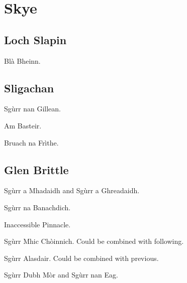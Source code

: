 
\section{Skye}

\subsection{Loch Slapin}

\begin{munros}
\item
Blà Bheinn.
\end{munros}


\subsection{Sligachan}

\begin{munros}
\item
Sgùrr nan Gillean.

\item
Am Basteir.

\item
Bruach na Frìthe.
\end{munros}


\subsection{Glen Brittle}

\begin{munros}
\item
Sgùrr a Mhadaidh and Sgùrr a Ghreadaidh.

\item
Sgùrr na Banachdich.

\item
Inaccessible Pinnacle.

\item
Sgùrr Mhic Chòinnich.  Could be combined with following.

\item
Sgùrr Alasdair.  Could be combined with previous. 

\item
Sgùrr Dubh Mòr and Sgùrr nan Eag.
\end{munros}
